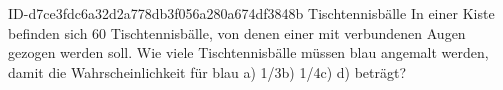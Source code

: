 \begin{exercise}
      {ID-d7ce3fdc6a32d2a778db3f056a280a674df3848b}
      {Tischtennisbälle}
  \ifproblem\problem
    In einer Kiste befinden sich 60 Tischtennisbälle, von denen einer mit
    verbundenen Augen gezogen werden soll. Wie viele Tischtennisbälle müssen
    blau angemalt werden, damit die Wahrscheinlichkeit für \glqq blau\grqq{}
    \quad a) 1/3\quad b) 1/4\quad c) \quad d) \quad beträgt?
  \fi
\end{exercise}
